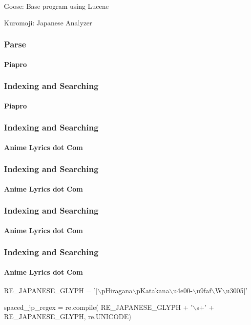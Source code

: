 \documentclass{beamer}
\begin{document}
\begin{CJK}{UTF8}{zhsong}
\begin{frame}
Goose: Base program using Lucene

Kuromoji: Japanese Analyzer
\end{frame}
\begin{frame}
\frametitle{Parse}
\framesubtitle{Piapro}
\end{frame}
\begin{frame}
\frametitle{Indexing and Searching}
\framesubtitle{Piapro}
\end{frame}
\begin{frame}
\frametitle{Indexing and Searching}
\framesubtitle{Anime Lyrics dot Com}
\end{frame}
\begin{frame}
\frametitle{Indexing and Searching}
\framesubtitle{Anime Lyrics dot Com}
\end{frame}
\begin{frame}
\frametitle{Indexing and Searching}
\framesubtitle{Anime Lyrics dot Com}
\end{frame}
\begin{frame}
\frametitle{Indexing and Searching}
\framesubtitle{Anime Lyrics dot Com}

RE\_JAPANESE\_GLYPH = '[$ \backslash $p{Hiragana}$ \backslash $p{Katakana}$ \backslash $u4e00-$ \backslash $u9faf$ \backslash $W$ \backslash $u3005]'

\vspace*{1em}
spaced\_jp\_regex = re.compile(
    RE\_JAPANESE\_GLYPH + '$ \backslash $s+' +
    RE\_JAPANESE\_GLYPH, re.UNICODE)


\end{frame}
\end{CJK}
\end{document}
